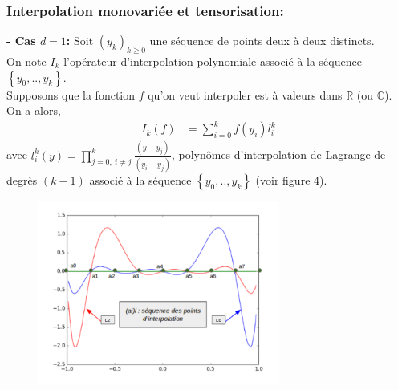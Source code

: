 \subsubsection{Interpolation monovariée et tensorisation:}\label{sec:4.1.1}
\hspace{0.5cm}
\textbf{ - Cas $d=1$: }
Soit $(y_k)_{k \geq 0}$ une séquence de points deux à deux distincts. \\
On note $I_k$ l'opérateur d'interpolation polynomiale associé à
la séquence $\left \{ y_0, .. , y_k \right \}$. \\
Supposons que la fonction $f$ qu'on veut interpoler est à valeurs dans $\mathbb{R}$ (ou $\mathbb{C}$).\\
\newpage
On a alors,
\begin{align}
   I_k(f) & = \sum_{i=0}^k f(y_i) l_i^k
\end{align}
avec $l_i^k(y) = \prod_{j=0,\ i \neq j}^k \frac{(y - y_j)}{(y_i - y_j)}$, polynômes d'interpolation de Lagrange
de degrès $(k-1)$ associé à la séquence $\left \{ y_0, .. , y_k \right \}$ (voir figure 4). \\
\begin{center}
\includegraphics[height=6cm,width=10cm]{images/lagrange_polynomials.png}
\end{center}

